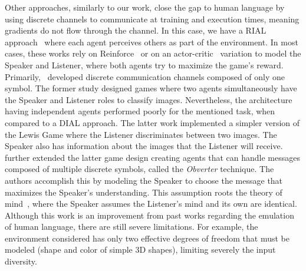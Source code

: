 Other approaches, similarly to our work, close the gap to human language by using discrete channels to communicate at training and execution times, meaning gradients do not flow through the channel. In this case, we have a RIAL approach~\citep{foerster2016learning} where each agent perceives others as part of the environment. In most cases, these works rely on Reinforce~\citep{williams1992simple} or on an actor-critic~\citep{konda1999actor} variation to model the Speaker and Listener, where both agents try to maximize the game's reward. Primarily,~\citet{foerster2016learning,lazaridou2017multiagent} developed discrete communication channels composed of only one symbol. The former study designed games where two agents simultaneously have the Speaker and Listener roles to classify images. Nevertheless, the architecture having independent agents performed poorly for the mentioned task, when compared to a DIAL approach. The latter work implemented a simpler version of the Lewis Game where the Listener discriminates between two images. The Speaker also has information about the images that the Listener will receive. \citet{choicompositional} further extended the latter game design creating agents that can handle messages composed of multiple discrete symbols, called the \textit{Obverter} technique. The authors accomplish this by modeling the Speaker to choose the message that maximizes the Speaker's understanding. This assumption roots the theory of mind~\citep{premack1978does}, where the Speaker assumes the Listener's mind and its own are identical. Although this work is an improvement from past works regarding the emulation of human language, there are still severe limitations. For example, the environment considered has only two effective degrees of freedom that must be modeled (shape and color of simple 3D shapes), limiting severely the input diversity.

